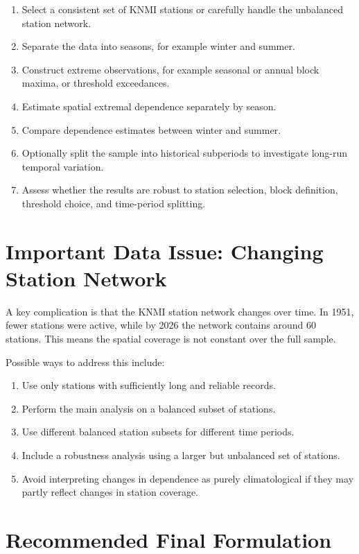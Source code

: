 \documentclass[11pt,a4paper]{article}
\begin{document}
\begin{enumerate}[label=\arabic*.]
    \item Select a consistent set of KNMI stations or carefully handle the unbalanced station network.
    \item Separate the data into seasons, for example winter and summer.
    \item Construct extreme observations, for example seasonal or annual block maxima, or threshold exceedances.
    \item Estimate spatial extremal dependence separately by season.
    \item Compare dependence estimates between winter and summer.
    \item Optionally split the sample into historical subperiods to investigate long-run temporal variation.
    \item Assess whether the results are robust to station selection, block definition, threshold choice, and time-period splitting.
\end{enumerate}

\section{Important Data Issue: Changing Station Network}

A key complication is that the KNMI station network changes over time. In 1951, fewer stations were active, while by 2026 the network contains around 60 stations. This means the spatial coverage is not constant over the full sample.

Possible ways to address this include:

\begin{enumerate}[label=\arabic*.]
    \item Use only stations with sufficiently long and reliable records.
    \item Perform the main analysis on a balanced subset of stations.
    \item Use different balanced station subsets for different time periods.
    \item Include a robustness analysis using a larger but unbalanced set of stations.
    \item Avoid interpreting changes in dependence as purely climatological if they may partly reflect changes in station coverage.
\end{enumerate}

\section{Recommended Final Formulation}
\end{document}
